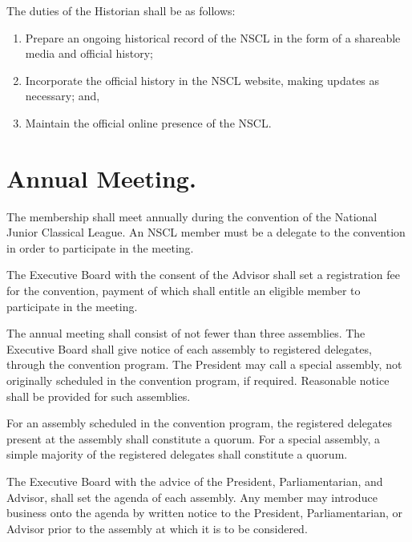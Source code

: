 \documentclass{bylaws}
\newcommand{\NSCL}{\textsc{NSCL}\xspace}
\begin{document}
\begin{linenumbers}[1]
\begin{enumerate}
    \sub[Historian] The duties of the Historian shall be as follows:
    \begin{enumerate}
    \item Prepare an ongoing historical record of the \NSCL in the form
      of a shareable media and official history;
    \item Incorporate the official history in the \NSCL website, making
      updates as necessary; and,
    \item Maintain the official online presence of the \NSCL.\\
    \end{enumerate}
  \end{enumerate}


  \section{Annual Meeting.} 
  The membership shall meet annually during the convention of the
  National Junior Classical League. An \NSCL member must be a delegate
  to the convention in order to participate in the meeting.
  \begin{enumerate}
     The Executive Board with the consent of the
    Advisor shall set a registration fee for the convention, payment of
    which shall entitle an eligible member to participate in the
    meeting.
    
    \sub[Assemblies] The annual meeting shall consist of not fewer than
    three assemblies. The Executive Board shall give notice of each
    assembly to registered delegates, through the convention program. The
    President may call a special assembly, not originally scheduled in
    the convention program, if required. Reasonable notice shall be
    provided for such assemblies.
    
    \sub[Quorum] For an assembly scheduled in the convention program,
    the registered delegates present at the assembly shall constitute a
    quorum. For a special assembly, a simple majority of the registered
    delegates shall constitute a quorum.
    
    \sub[Agenda] The Executive Board with the advice of the President,
    Parliamentarian, and Advisor, shall set the agenda of each
    assembly. Any member may introduce business onto the agenda by
    written notice to the President,  Parliamentarian, or Advisor prior
    to the assembly at which it is to be considered.\\ 
  \end{enumerate}


\end{linenumbers}
\end{document}
